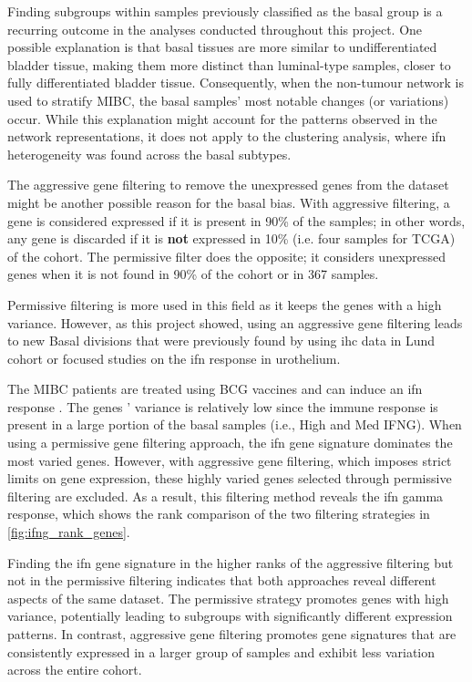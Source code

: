 Finding subgroups within samples previously classified as the basal group is a recurring outcome in the analyses conducted throughout this project. One possible explanation is that basal tissues are more similar to undifferentiated bladder tissue, making them more distinct than luminal-type samples, closer to fully differentiated bladder tissue. Consequently, when the non-tumour network is used to stratify MIBC, the basal samples' most notable changes (or variations) occur. While this explanation might account for the patterns observed in the network representations, it does not apply to the clustering analysis, where \acrshort{ifn} heterogeneity was found across the basal subtypes.

The aggressive gene filtering to remove the unexpressed genes from the dataset might be another possible reason for the basal bias. With aggressive filtering, a gene is considered expressed if it is present in 90\% of the samples; in other words, any gene is discarded if it is \textbf{not} expressed in 10\% (i.e. four samples for TCGA) of the cohort. The permissive filter does the opposite; it considers unexpressed genes when it is not found in 90\% of the cohort or in 367 samples. 

Permissive filtering is more used in this field as it keeps the genes with a high variance. However, as this project showed, using an aggressive gene filtering leads to new Basal divisions that were previously found by using \acrshort{ihc} data in Lund cohort \citep{Marzouka2018-ge} or focused studies on the \acrshort{ifn} response in urothelium.

The MIBC patients are treated using BCG vaccines and can induce an \acrshort{ifn} response \citep{Baker2022-bj}. The genes ' variance is relatively low since the immune response is present in a large portion of the basal samples (i.e., High and Med IFNG). When using a permissive gene filtering approach, the \acrshort{ifn} gene signature dominates the most varied genes. However, with aggressive gene filtering, which imposes strict limits on gene expression, these highly varied genes selected through permissive filtering are excluded. As a result, this filtering method reveals the \acrlong{ifn} gamma response, which shows the rank comparison of the two filtering strategies in \cref{fig:ifng_rank_genes}.

Finding the \acrlong{ifn} gene signature in the higher ranks of the aggressive filtering but not in the permissive filtering indicates that both approaches reveal different aspects of the same dataset. The permissive strategy promotes genes with high variance, potentially leading to subgroups with significantly different expression patterns. In contrast, aggressive gene filtering promotes gene signatures that are consistently expressed in a larger group of samples and exhibit less variation across the entire cohort.


